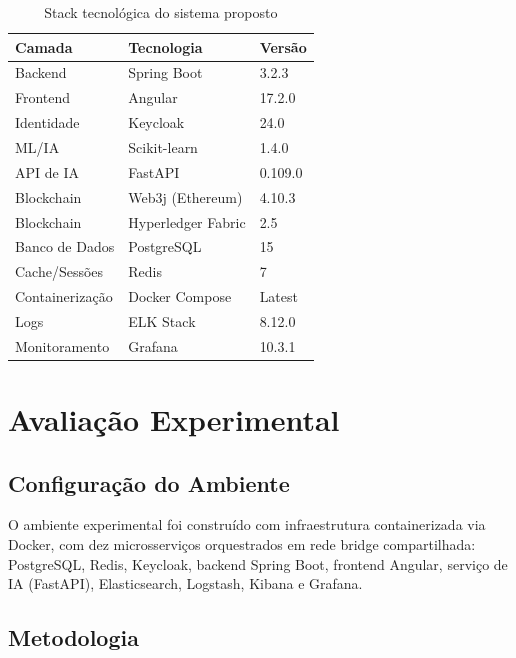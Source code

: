 \documentclass[12pt]{article}
\begin{document}
\begin{table}[H]
\centering
\caption{Stack tecnológica do sistema proposto}
\label{tab:tech_stack}
\small
\begin{tabular}{@{}lll@{}}
\toprule
\textbf{Camada} & \textbf{Tecnologia} & \textbf{Versão} \\
\midrule
Backend           & Spring Boot        & 3.2.3 \\
Frontend          & Angular            & 17.2.0 \\
Identidade        & Keycloak           & 24.0 \\
ML/IA             & Scikit-learn       & 1.4.0 \\
API de IA         & FastAPI            & 0.109.0 \\
Blockchain        & Web3j (Ethereum)   & 4.10.3 \\
Blockchain        & Hyperledger Fabric & 2.5 \\
Banco de Dados    & PostgreSQL         & 15 \\
Cache/Sessões     & Redis              & 7 \\
Containerização   & Docker Compose     & Latest \\
Logs              & ELK Stack          & 8.12.0 \\
Monitoramento     & Grafana            & 10.3.1 \\
\bottomrule
\end{tabular}
\end{table}

\section{Avaliação Experimental}

\subsection{Configuração do Ambiente}

O ambiente experimental foi construído com infraestrutura containerizada via Docker, com dez microsserviços orquestrados em rede bridge compartilhada: PostgreSQL, Redis, Keycloak, backend Spring Boot, frontend Angular, serviço de IA (FastAPI), Elasticsearch, Logstash, Kibana e Grafana.

\subsection{Metodologia}
\end{document}

